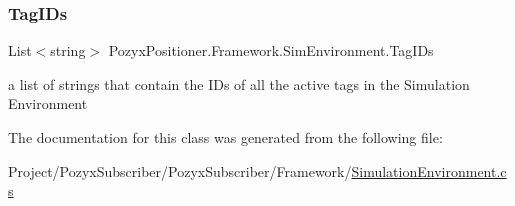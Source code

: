 \subsubsection{\texorpdfstring{Tag\+I\+Ds}{TagIDs}}
{\footnotesize\ttfamily List$<$string$>$ Pozyx\+Positioner.\+Framework.\+Sim\+Environment.\+Tag\+I\+Ds\hspace{0.3cm}{\ttfamily [get]}}



a list of strings that contain the I\+Ds of all the active tags in the Simulation Environment 



The documentation for this class was generated from the following file\+:\begin{DoxyCompactItemize}
\item 
Project/\+Pozyx\+Subscriber/\+Pozyx\+Subscriber/\+Framework/\hyperlink{_simulation_environment_8cs}{Simulation\+Environment.\+cs}\end{DoxyCompactItemize}
